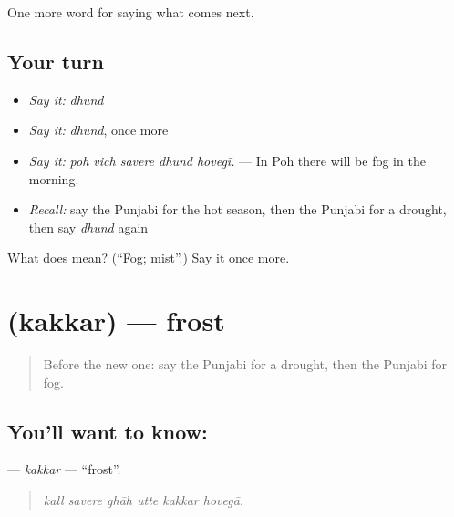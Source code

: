 \begin{grammarlens}[title={What you've built}]
One more word for saying what comes next.
\end{grammarlens}

\subsection*{Your turn}
\begin{itemize}
\raggedright
  \item \emph{Say it:} \emph{dhund}
  \item \emph{Say it:} \emph{dhund}, once more
  \item \emph{Say it:} \emph{poh vich savere dhund hovegī.} — In Poh there will be fog in the morning.
  \item \emph{Recall:} say the Punjabi for the hot season, then the Punjabi for a drought, then say \emph{dhund} again
\end{itemize}

\begin{tcolorbox}[breakable,colback=teal!4,colframe=teal!35!black,title={Before you move on}]
What does  mean? (\textquotedblleft{}Fog; mist\textquotedblright{}.) Say it once more.
\end{tcolorbox}
\section[\texorpdfstring{\pa{ਕੱਕਰ} (kakkar)}{ਕੱਕਰ (kakkar)}]{ (kakkar) — frost}

\label{lesson:PA-C289-kakkar}



\begin{quote}
Before the new one: say the Punjabi for a drought, then the Punjabi for fog.
\end{quote}

\subsection*{You'll want to know: }
\textbf{} — \emph{kakkar} — \textquotedblleft{}frost\textquotedblright{}.

\begin{quote}
     
\end{quote}

\begin{quote}
\emph{kall savere ghāh utte kakkar hovegā.}
\end{quote}

